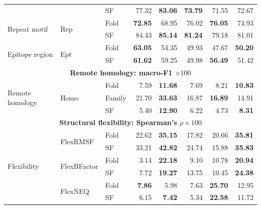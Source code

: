 \begin{table}[p]
{\begin{tabular}{@{}lllrr@{\hspace{6pt}}rrr@{}}
 &  & SF & 77.32 & \textbf{83.06} & \textbf{73.79} & 71.55 & 72.67 \\
\multirow{2}{*}{Repeat motif} & \multirow{2}{*}{Rep} & Fold & \textbf{72.85} & 68.95 & 76.02 & \textbf{76.05} & 74.93 \\
 &  & SF & 84.43 & \textbf{85.14} & \textbf{81.24} & 79.18 & 81.01 \\
\multirow{2}{*}{Epitope region} & \multirow{2}{*}{Ept} & Fold & \textbf{63.05} & 54.35 & 49.93 & 47.67 & \textbf{50.20} \\
 &  & SF & \textbf{61.62} & 59.25 & 49.98 & \textbf{56.49} & 51.42 \\
\midrule
\multicolumn{8}{c}{\textbf{Remote homology: macro-F1 $\times100$}} \\
\midrule
\multirow{3}{*}{Remote homology} & \multirow{3}{*}{Homo} & Fold & 7.59 & \textbf{11.68} & 7.69 & 8.21 & \textbf{10.83} \\
 &  & Family & 21.70 & \textbf{33.63} & 16.87 & \textbf{16.89} & 14.91 \\
 &  & SF & 5.40 & \textbf{12.90} & 6.22 & 4.73 & \textbf{8.31} \\
\midrule
\multicolumn{8}{c}{\textbf{Structural flexibility: Spearman's $\rho\times100$}} \\
\midrule
\multirow{6}{*}{Flexibility} & \multirow{2}{*}{FlexRMSF} & Fold & 22.62 & \textbf{35.15} & 17.82 & 20.66 & \textbf{35.81} \\
 &  & SF & 33.21 & \textbf{42.82} & 24.74 & 15.88 & \textbf{35.83} \\
 & \multirow{2}{*}{FlexBFactor} & Fold & 3.14 & \textbf{22.18} & 9.10 & 10.78 & \textbf{20.94} \\
 &  & SF & 7.72 & \textbf{19.27} & 13.75 & 10.45 & \textbf{24.38} \\
 & \multirow{2}{*}{FlexNEQ} & Fold & \textbf{7.86} & 5.98 & 7.63 & \textbf{25.70} & 12.95 \\
 &  & SF & 6.15 & \textbf{7.42} & 5.34 & \textbf{22.58} & 11.72 \\
\bottomrule
\end{tabular}%
}
\stbworkshopfit
\end{table}
\clearpage
\endgroup
